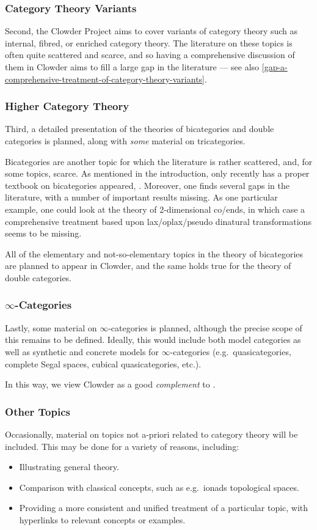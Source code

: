 \subsubsection{Category Theory Variants}\label{subsubsection-category-theory-variants}
Second, the Clowder Project aims to cover variants of category theory such as internal, fibred, or enriched category theory. The literature on these topics is often quite scattered and scarce, and so having a comprehensive discussion of them in Clowder aims to fill a large gap in the literature --- see also \cref{gap-a-comprehensive-treatment-of-category-theory-variants}.
\subsubsection{Higher Category Theory}\label{subsubsection-higher-category-theory}
Third, a detailed presentation of the theories of bicategories and double categories is planned, along with \emph{some} material on tricategories.

Bicategories are another topic for which the literature is rather scattered, and, for some topics, scarce. As mentioned in the introduction, only recently has a proper textbook on bicategories appeared, \cite{2-categories-book}. Moreover, one finds several gaps in the literature, with a number of important results missing. As one particular example, one could look at the theory of 2-dimensional co/ends, in which case a comprehensive treatment based upon lax/oplax/pseudo dinatural transformations seems to be missing.

All of the elementary and not-so-elementary topics in the theory of bicategories are planned to appear in Clowder, and the same holds true for the theory of double categories.
\subsubsection{$\infty$-Categories}\label{susbsection-infty-categories}
Lastly, some material on $\infty$-categories is planned, although the precise scope of this remains to be defined. Ideally, this would include both model categories as well as synthetic and concrete models for $\infty$-categories (e.g.\ quasicategories, complete Segal spaces, cubical quasicategories, etc.).

In this way, we view Clowder as a good \emph{complement} to \cite{kerodon}.
\subsubsection{Other Topics}\label{subsubsection-other-topics}
Occasionally, material on topics not a-priori related to category theory will be included. This may be done for a variety of reasons, including:
\begin{itemize}
    \item Illustrating general theory.
    \item Comparison with classical concepts, such as e.g.\ ionads \vs topological spaces.
    \item Providing a more consistent and unified treatment of a particular topic, with hyperlinks to relevant concepts or examples.
\end{itemize}
